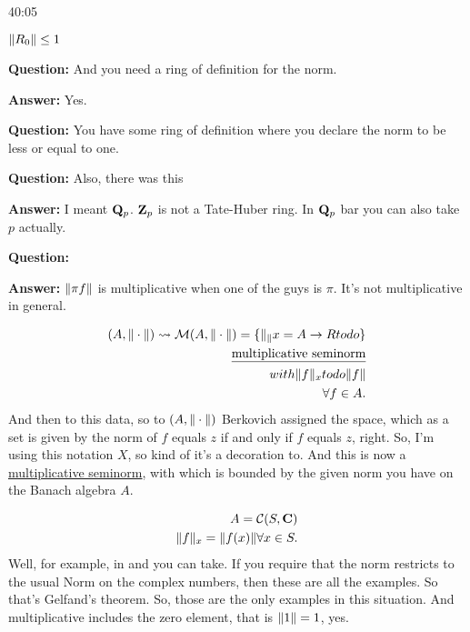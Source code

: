 \begin{example}
\begin{unfinished}{40:05}
\begin{example}
 $\| R_0 \| \leq 1$
\end{example}

\textbf{Question:} And you need a ring of definition for the norm. 

\textbf{Answer:} Yes.

\textbf{Question:} You have some ring of definition where you declare the norm to be less or equal to one.


\textbf{Question:} Also, there was this 

\textbf{Answer:} I meant $\mathbf Q_p$. $\mathbf Z_p$ is not a Tate-Huber ring. In $\mathbf Q_p$ bar  you can also take $p$ actually. 


\textbf{Question:} 

\textbf{Answer:} $\| \pi f \|$ is multiplicative when one of the guys is $\pi$. It's not multiplicative in general.


\begin{align*}
(A, \| \cdot \|) \leadsto \mathcal{M}(A, \| \cdot \|) = \{ \| _ \|{x} = A \to R todo \} \\
\text{\underline{multiplicative seminorm}} \\
with \| f \|_x todo \| f \| \\
\forall f \in A.
\end{align*}
And then to this data, so to $(A, \| \cdot \|)$ Berkovich assigned the space, which as a set is given by the norm of $f$ equals $z$ if and only if $f$ equals $z$, right.
So, I'm using this notation $X$, so kind of it's a decoration to. And this is now a \underline{multiplicative seminorm}, with which is bounded by the given norm you have on the Banach algebra $A$.

\begin{example} 
\begin{align*}
A = \mathcal{C}(S, \mathbf C) \\
\| f \|_x = \| f(x) \| \forall x \in S.
\end{align*}
Well, for example, in and you can take. If you require that the norm restricts to the usual Norm on the complex numbers, then these are all the examples. So that's Gelfand's theorem. So, those are the only examples in this situation. And multiplicative includes the zero element, that is $\| 1 \| = 1$, yes.


\end{example}
\end{unfinished}
\end{example}
